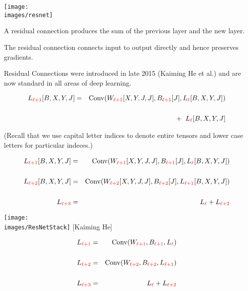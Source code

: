 {

\vfill
\texttt{[image: \\images/resnet]}
\hfill \begin{minipage}[b]{4in}
  A residual connection produces the sum of the previous layer and the new layer.

  \bigskip
  The residual connection connects input to output directly and hence preserves gradients.

  \bigskip
  Residual Connections were introduced in late 2015 (Kaiming He et al.) and are now standard in all areas of deep learning.
\end{minipage}


\medskip
\begin{eqnarray*}
L_{\color{red} \ell+1}[B,X,Y,J] & = & \mathrm{Conv}(W_{\color{red} \ell+1}[X,Y,J,J],B_{\color{red} \ell+1}[J],L_{\color{red} \ell}[B,X,Y,J]) \\
\\
& & + \;\; L_{\color{red} \ell}[B,X,Y,J]
\end{eqnarray*}

\vfill (Recall that we use capital letter indices to denote entire tensors and lower case letters for particular indeces.)


\begin{eqnarray*}
L_{\color{red} \ell+1}[B,X,Y,J] & = & \mathrm{Conv}(W_{\color{red} \ell+1}[X,Y,J,J],B_{\color{red} \ell+1}[J],L_{\color{red} \ell}[B,X,Y,J]) \\
\\
L_{\color{red} \ell+2}[B,X,Y,J] & = & \mathrm{Conv}(W_{\color{red} \ell+2}[X,Y,J,J],B_{\color{red} \ell+2}[J],L_{\color{red} \ell+1}[B,X,Y,J]) \\
\\
L_{\color{red} \ell+3} & = & L_{\color{red} \ell} + L_{\color{red} \ell+2}
\end{eqnarray*}


\centerline{\texttt{[image: \\images/ResNetStack]} {\large [Kaiming He]}}


\medskip
\begin{eqnarray*}
L_{\color{red} \ell+1} & = & \mathrm{Conv}(W_{\color{red} \ell+1},B_{\color{red} \ell+1},L_{\color{red} \ell}) \\
\\
L_{\color{red} \ell+2} & = & \mathrm{Conv}(W_{\color{red} \ell+2},B_{\color{red} \ell+2},L_{\color{red} \ell+1}) \\
\\
L_{\color{red} \ell+3} & = & L_{\color{red} \ell} + L_{\color{red} \ell+2}
\end{eqnarray*}

}

